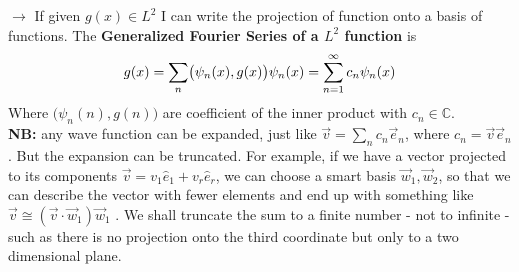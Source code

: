 $\rightarrow$ If given $g(x)\in L^2$ I can write the projection of function onto a basis of functions. The \textbf{Generalized Fourier Series of a $L^2$ function} is\\
\[
g(x)=\sum_{n}\bigl(\psi_n(x),g(x)\bigr)\psi_n(x) =\sum_{n=1}^{\infty}c_n\psi_n(x)\\
\]
Where $\bigl(\psi_n(n),g(n)\bigr)$ are coefficient of the inner product with $c_n\in \mathbb{C}$. \\

\textbf{NB:} any wave function can be expanded, just like $\vec{v} = \sum_n c_n \vec{e}_n$, where $c_n = \vec{v} \vec{e}_n$. But the expansion can be truncated. For example, if we have a vector projected to its components $\vec v = v_1\hat{e}_1+v_r\hat{e}_r$, we can choose a smart basis ${\vec{w}_1, \vec{w}_2}$, so that we can describe the vector with fewer elements and end up with something like $ \vec{v} \cong (\vec{v} \cdot \vec{w}_1) \vec{w}_1 $ .
We shall truncate the sum to a finite number - not to infinite - such as there is no projection onto the third coordinate but only to a two dimensional plane.\\



